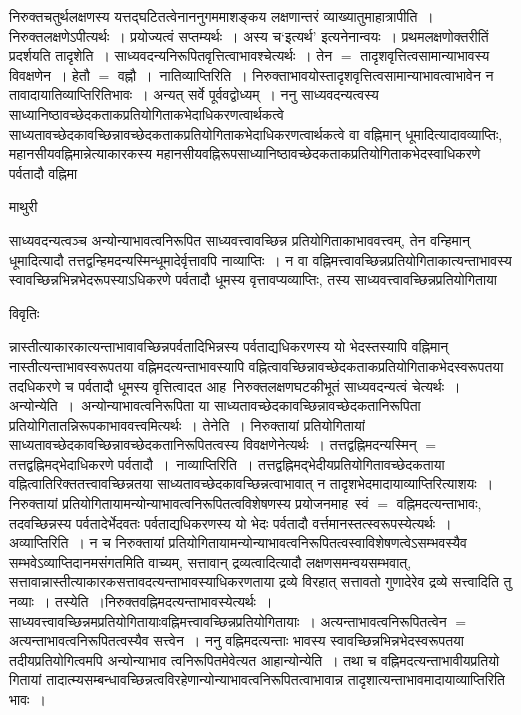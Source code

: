 \documentclass[10pt, openany]{book}
\begin{document}
{निरुक्तचतुर्थलक्षणस्य यत्तद्घटितत्वेनाननुगममाशङ्कय लक्षणान्तरं व्याख्यातुमाहात्रापीति~। निरुक्तलक्षणेऽपीत्यर्थः~। प्रयोज्यत्वं सप्तम्यर्थः~। अस्य च`इत्यर्थ' इत्यनेनान्वयः~। प्रथमलक्षणोक्तरीतिं प्रदर्शयति {\la तादृशेति~।} साध्यवदन्यनिरूपितवृत्तित्वाभावश्चेत्यर्थः~। तेन $=$ तादृशवृत्तित्वसामान्याभावस्य विवक्षणेन~। हेतौ $=$ वह्नौ~।~{\la नातिव्याप्तिरिति~।} निरुक्ताभावयोस्तादृशवृत्तित्वसामान्याभावत्वाभावेन न तावादायातिव्याप्तिरितिभावः~। अन्यत् सर्वे पूर्ववद्वोध्यम्~। ननु साध्यवदन्यत्वस्य
साध्यानिष्ठावच्छेदकताकप्रतियोगिताकभेदाधिकरणत्वार्थकत्वे साध्यतावच्छेदकावच्छिन्नावच्छेदकताकप्रतियोगिताकभेदाधिकरणत्वार्थकत्वे वा वह्निमान् धूमादित्यादावव्याप्तिः, महानसीयवह्निमान्नेत्याकारकस्य महानसीयवह्निरूपसाध्यानिष्ठावच्छेदकताकप्रतियोगिताकभेदस्वाधिकरणे पर्वतादौ वह्निमा
\newpage
\begin{center}  माथुरी  \end{center} 
{\la साध्यवदन्यत्वञ्च  अन्योन्याभावत्वनिरूपित साध्यवत्त्वावच्छिन्न प्रतियोगिताकाभाववत्त्वम्, तेन वन्हिमान् धूमादित्यादौ तत्तद्वन्हिमदन्यस्मिन्धूमादेर्वृत्तावपि नाव्याप्तिः~। न वा वह्निमत्त्वावच्छिन्नप्रतियोगिताकात्यन्ताभावस्य स्वावच्छिन्नभिन्नभेदरूपस्याऽधिकरणे पर्वतादौ  धूमस्य वृत्तावप्यव्याप्तिः, तस्य साध्यवत्त्वावच्छिन्नप्रतियोगिताया }
\begin{center}     विवृतिः \end{center}
न्नास्तीत्याकारकात्यन्ताभावावच्छिन्नपर्वतादिभिन्नस्य पर्वताद्यधिकरणस्य यो भेदस्तस्यापि वह्निमान् नास्तीत्यन्ताभावस्वरूपतया वह्निमदत्यन्ताभावस्यापि
वह्नित्वावच्छिन्नावच्छेदकताकप्रतियोगिताकभेदस्वरूपतया तदधिकरणे च पर्वतादौ धूमस्य वृत्तित्वादत आह~निरुक्तलक्षणघटकीभूतं साध्यवदन्यत्वं चेत्यर्थः~। {\la अन्योन्येति~।}~अन्योन्याभावत्वनिरूपिता या साध्यतावच्छेदकावच्छिन्नावच्छेदकतानिरूपिता
प्रतियोगितातन्निरूपकाभाववत्त्वमित्यर्थः~। {\la तेनेति~।} निरुक्तायां प्रतियोगितायां साध्यतावच्छेदकावच्छिन्नावच्छेदकतानिरूपितत्वस्य विवक्षणेनेत्यर्थः~। तत्तद्वह्निमदन्यस्मिन् $=$ तत्तद्वह्निमद्भेदाधिकरणे पर्वतादौ~।~{\la नाव्याप्तिरिति~।} तत्तद्वह्निमद्भेदीयप्रतियोगितावच्छेदकताया वह्नित्वातिरिक्ततत्त्वावच्छिन्नतया साध्यतावच्छेदकावच्छिन्नत्वाभावात् न तादृशभेदमादायाव्याप्तिरित्याशयः~। निरुक्तायां प्रतियोगितायामन्योन्याभावत्वनिरूपितत्वविशेषणस्य प्रयोजनमाह~स्वं $=$ वह्निमदत्यन्ताभावः, तदवच्छिन्नस्य पर्वतादेर्भेदवतः पर्वताद्यधिकरणस्य यो भेदः पर्वतादौ वर्त्तमानस्तत्स्वरूपस्येत्यर्थः~। {\la अव्याप्तिरिति~।} न च निरुक्तायां प्रतियोगितायामन्योन्याभावत्वनिरूपितत्वस्वाविशेषणत्वेऽसम्भवस्यैव सम्भवेऽव्याप्तिदानमसंगतमिति वाच्यम्, सत्तावान् द्रव्यत्वादित्यादौ लक्षणसमन्वयसम्भवात्, सत्तावान्नास्तीत्याकारकसत्तावदत्यन्ताभावस्याधिकरणताया द्रव्ये विरहात् सत्तावतो गुणादेरेव द्रव्ये सत्त्वादिति तु नव्याः~। तस्येति~।निरुक्तवह्निमदत्यन्ताभावस्येत्यर्थः~। साध्यवत्त्वावच्छिन्नमप्रतियोगितायाःवह्निमत्त्वावच्छिन्नप्रतियोगितायाः~। अत्यन्ताभावत्वनिरूपितत्वेन $=$ अत्यन्ताभावत्वनिरूपितत्वस्यैव सत्त्वेन~। ननु वह्निमदत्यन्ताः भावस्य स्वावच्छिन्नभिन्नभेदस्वरूपतया तदीयप्रतियोगित्वमपि अन्योन्याभाव त्वनिरूपितमेवेत्यत आहान्योन्येति~। तथा च वह्निमदत्यन्ताभावीयप्रतियो गितायां तादात्म्यसम्बन्धावच्छिन्नत्वविरहेणान्योन्याभावत्वनिरूपितत्वाभावान्न तादृशात्यन्ताभावमादायाव्याप्तिरिति भावः~।
}
\end{document}
